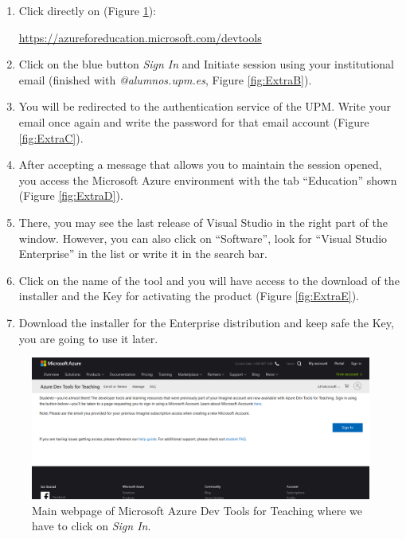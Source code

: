 \begin{enumerate}
    \item Click directly on (Figure \ref{fig:ExtraA}):
    
     \url{https://azureforeducation.microsoft.com/devtools}
    \item Click on the blue button \textit{Sign In} and Initiate session using your institutional email (finished with \textit{@alumnos.upm.es}, Figure \ref{fig:ExtraB}).
    \item You will be redirected to the authentication service of the UPM. Write your email once again and write the password for that email account (Figure \ref{fig:ExtraC}).
    \item After accepting a message that allows you to maintain the session opened, you access the Microsoft Azure environment with the tab ``Education'' shown (Figure \ref{fig:ExtraD}).
    \item There, you may see the last release of Visual Studio in the right part of the window. However, you can also click on ``Software'', look for ``Visual Studio Enterprise'' in the list or write it in the search bar.
    \item Click on the name of the tool and you will have access to the download of the installer and the Key for activating the product (Figure \ref{fig:ExtraE}). 
    \item Download the installer for the Enterprise distribution and keep safe the Key, you are going to use it later.    
\end{enumerate}

\begin{figure}
    \centering
    \includegraphics[width= \textwidth]{Figures/ExtraA}
    \caption{Main webpage of Microsoft Azure Dev Tools for Teaching where we have to click on \textit{Sign In}.}
    \label{fig:ExtraA}
\end{figure}

